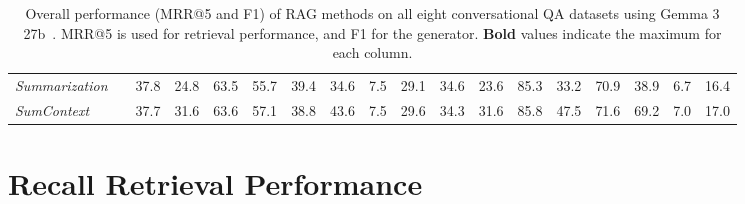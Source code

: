 \documentclass[11pt]{article}
\begin{document}
\begin{table}[!th]
{\begin{tabular}{l l|cc|cc|cc|cc||cc|cc||cc|cc}
\textit{Summarization} & & 37.8 & 24.8 & 63.5 & 55.7 & 39.4 & 34.6 & 7.5 & 29.1 & 34.6 & 23.6 & 85.3 & 33.2 & 70.9 & 38.9 & 6.7 & 16.4 \\
\textit{SumContext} & & 37.7 & 31.6 & 63.6 & 57.1 & 38.8 & 43.6 & 7.5 & 29.6 & 34.3 & 31.6 & 85.8 & 47.5 & 71.6 & 69.2 & 7.0 & 17.0 \\
\bottomrule
\end{tabular}
}
\caption{Overall performance (MRR@5 and F1) of RAG methods on all eight conversational QA datasets using Gemma 3 27b~\cite{kamath_gemma_2025}. MRR@5 is used for retrieval performance, and F1 for the generator. \textbf{Bold} values indicate the maximum for each column.}
\label{tab:gemma3_27b_rag}
\end{table}


\section{Recall Retrieval Performance}\label{apx:retrieval}
\end{document}
